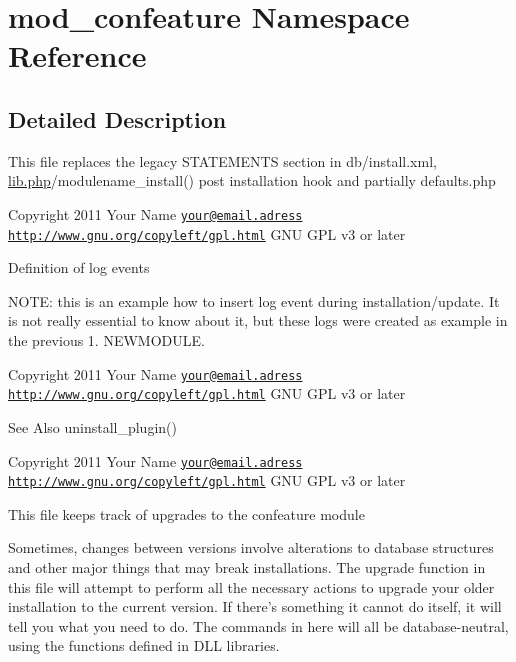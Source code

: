 \hypertarget{namespacemod__confeature}{\section{mod\-\_\-confeature Namespace Reference}
\label{namespacemod__confeature}
}


\subsection{Detailed Description}
This file replaces the legacy S\-T\-A\-T\-E\-M\-E\-N\-T\-S section in db/install.\-xml, \hyperlink{lib_8php}{lib.\-php}/modulename\-\_\-install() post installation hook and partially defaults.\-php

\begin{DoxyCopyright}{Copyright}
2011 Your Name \href{mailto:your@email.adress}{\tt your@email.\-adress}  \href{http://www.gnu.org/copyleft/gpl.html}{\tt http\-://www.\-gnu.\-org/copyleft/gpl.\-html} G\-N\-U G\-P\-L v3 or later
\end{DoxyCopyright}
Definition of log events

N\-O\-T\-E\-: this is an example how to insert log event during installation/update. It is not really essential to know about it, but these logs were created as example in the previous 1. N\-E\-W\-M\-O\-D\-U\-L\-E.

\begin{DoxyCopyright}{Copyright}
2011 Your Name \href{mailto:your@email.adress}{\tt your@email.\-adress}  \href{http://www.gnu.org/copyleft/gpl.html}{\tt http\-://www.\-gnu.\-org/copyleft/gpl.\-html} G\-N\-U G\-P\-L v3 or later
\end{DoxyCopyright}
\begin{DoxySeeAlso}{See Also}
uninstall\-\_\-plugin()
\end{DoxySeeAlso}
\begin{DoxyCopyright}{Copyright}
2011 Your Name \href{mailto:your@email.adress}{\tt your@email.\-adress}  \href{http://www.gnu.org/copyleft/gpl.html}{\tt http\-://www.\-gnu.\-org/copyleft/gpl.\-html} G\-N\-U G\-P\-L v3 or later
\end{DoxyCopyright}
This file keeps track of upgrades to the confeature module

Sometimes, changes between versions involve alterations to database structures and other major things that may break installations. The upgrade function in this file will attempt to perform all the necessary actions to upgrade your older installation to the current version. If there's something it cannot do itself, it will tell you what you need to do. The commands in here will all be database-\/neutral, using the functions defined in D\-L\-L libraries.

